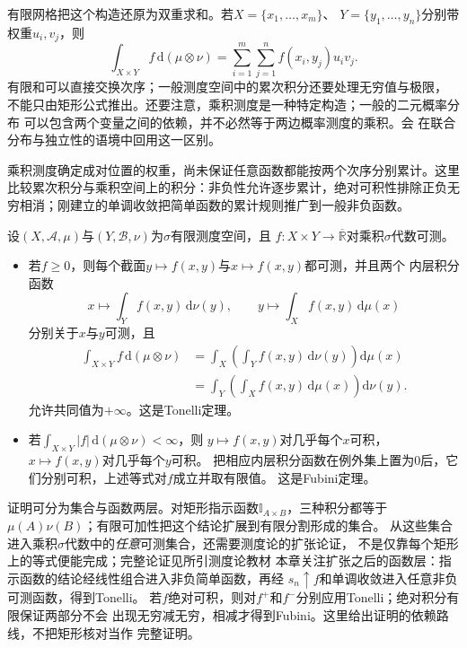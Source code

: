 有限网格把这个构造还原为双重求和。若$X=\{x_1,\ldots,x_m\}$、
$Y=\{y_1,\ldots,y_n\}$分别带权重$u_i,v_j$，则
\[
  \int_{X\times Y}f\,\mathrm{d}(\mu\otimes\nu)
  =
  \sum_{i=1}^m\sum_{j=1}^n f(x_i,y_j)u_iv_j.
\]
有限和可以直接交换次序；一般测度空间中的累次积分还要处理无穷值与极限，
不能只由矩形公式推出。还要注意，乘积测度是一种特定构造；一般的二元概率分布
可以包含两个变量之间的依赖，并不必然等于两边概率测度的乘积。会
在联合分布与独立性的语境中回用这一区别。

乘积测度确定成对位置的权重，尚未保证任意函数都能按两个次序分别累计。这里比较累次积分与乘积空间上的积分：非负性允许逐步累计，绝对可积性排除正负无穷相消；刚建立的单调收敛把简单函数的累计规则推广到一般非负函数。
\begin{theorem}[Tonelli与Fubini定理]
\label{thm:analysis-tonelli-fubini}
设$(X,\mathcal{A},\mu)$与$(Y,\mathcal{B},\nu)$为$\sigma$有限测度空间，且 $f:X\times Y\to\overline{\mathbb{R}}$对乘积$\sigma$代数可测。
\begin{itemize}

\item 若$f\geq0$，则每个截面$y\mapsto f(x,y)$与$x\mapsto f(x,y)$都可测，并且两个
  内层积分函数
  \[
    x\longmapsto\int_Yf(x,y)\,\mathrm{d}\nu(y),
    \qquad
    y\longmapsto\int_Xf(x,y)\,\mathrm{d}\mu(x)
  \]
  分别关于$x$与$y$可测，且
  \[
    \begin{aligned}
      \int_{X\times Y}f\,\mathrm{d}(\mu\otimes\nu)
      &=
      \int_X\left(\int_Yf(x,y)\,\mathrm{d}\nu(y)\right)\mathrm{d}\mu(x)\\
      &=
      \int_Y\left(\int_Xf(x,y)\,\mathrm{d}\mu(x)\right)\mathrm{d}\nu(y).
    \end{aligned}
  \]
  允许共同值为$+\infty$。这是Tonelli定理。
\item 若$\int_{X\times Y}|f|\,\mathrm{d}(\mu\otimes\nu)<\infty$，则
  $y\mapsto f(x,y)$对几乎每个$x$可积，$x\mapsto f(x,y)$对几乎每个$y$可积。
  把相应内层积分函数在例外集上置为$0$后，它们分别可积，上述等式对$f$成立并取有限值。
  这是Fubini定理。
\end{itemize}
\end{theorem}

证明可分为集合与函数两层。对矩形指示函数$\mathbb I_{A\times B}$，三种积分都等于
$\mu(A)\nu(B)$；有限可加性把这个结论扩展到有限分割形成的集合。
从这些集合进入乘积$\sigma$代数中的\emph{任意}可测集合，还需要测度论的扩张论证，
不是仅靠每个矩形上的等式便能完成；完整论证见所引测度论教材
本章关注扩张之后的函数层：指示函数的结论经线性组合进入非负简单函数，再经
$s_n\uparrow f$和单调收敛进入任意非负可测函数，得到Tonelli。
若$f$绝对可积，则对$f^+$和$f^-$分别应用Tonelli；绝对积分有限保证两部分不会
出现无穷减无穷，相减才得到Fubini。这里给出证明的依赖路线，不把矩形核对当作
完整证明。

